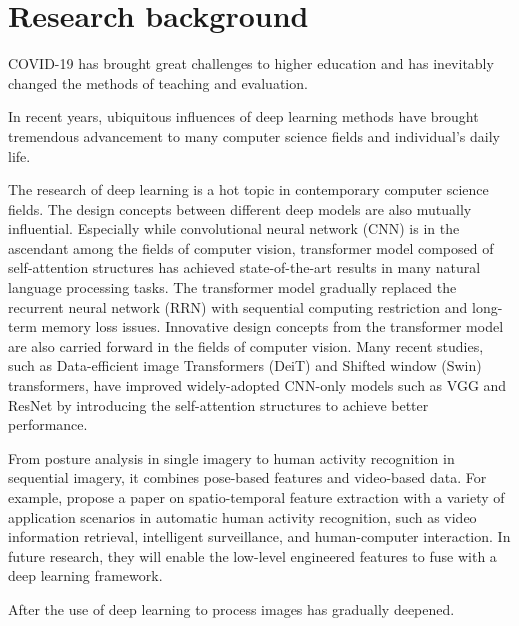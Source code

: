 \section{Research background}
\label{sec:Research background}
COVID-19 has brought great challenges to higher education and has inevitably changed the methods of teaching and evaluation.

In recent years, ubiquitous influences of deep learning methods have brought tremendous advancement to many computer science fields and individual's daily life.

The research of deep learning is a hot topic in contemporary computer science fields.
The design concepts between different deep models are also mutually influential.
Especially while convolutional neural network (CNN) is in the ascendant among the fields of computer vision, transformer model composed of self-attention structures has achieved state-of-the-art results in many natural language processing tasks.
The transformer model gradually replaced the recurrent neural network (RRN) with sequential computing restriction and long-term memory loss issues.
Innovative design concepts from the transformer model are also carried forward in the fields of computer vision.
Many recent studies, such as Data-efficient image Transformers (DeiT) and Shifted window (Swin) transformers, have improved widely-adopted CNN-only models such as VGG and ResNet by introducing the self-attention structures to achieve better performance.




From posture analysis in single imagery to human activity recognition in sequential imagery, it combines pose-based features and video-based data.
For example, \citet{yao2016spatio} propose a paper on spatio-temporal feature extraction with a variety of application scenarios in automatic human activity recognition, such as video information retrieval, intelligent surveillance, and human-computer interaction.
In future research, they will enable the low-level engineered features to fuse with a deep learning framework.

After the use of deep learning to process images has gradually deepened.
